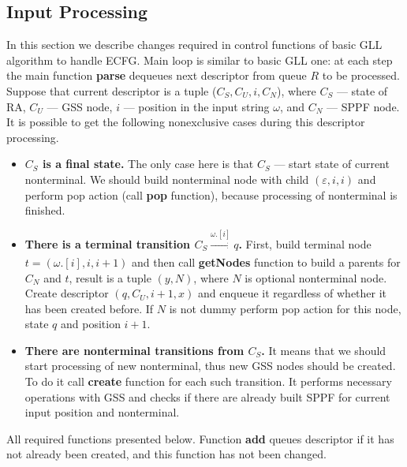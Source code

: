 \documentclass[runningheads,a4paper]{llncs}
\begin{document}
\subsection{Input Processing}%

In this section we describe changes required in control functions of basic GLL algorithm to handle ECFG.
Main loop is similar to basic GLL one: at each step the main function \textbf{parse} dequeues next descriptor
from queue $R$ to be processed.
Suppose that current descriptor is a tuple ($C_S, C_U, i, C_N$), where $C_S$ --- state of RA,
$C_U$ --- GSS node, $i$ --- position in the input string $\omega$, and $C_N$ --- SPPF node. 
It is possible to get the following nonexclusive cases during this descriptor processing.

\begin{itemize} 
    \item \textbf{$C_S$ is a final state.} The only case here is that $C_S$ --- start state of current nonterminal. 
    We should build nonterminal node with child $(\varepsilon, i, i)$ and perform pop action
    (call \textbf{pop} function), because processing of nonterminal is finished.
    
    \item \textbf{There is a terminal transition $C_S \xrightarrow[]{\omega.[i]} q$.} 
    First, build terminal node $ t = (\omega.[i], i, i+1) $ and then call \textbf{getNodes} function
    to build a parents for $ C_N $ and $ t $, result is a tuple $ (y, N) $, where $N$ is optional nonterminal node.
    Create descriptor $ (q, C_U, i+1, x) $ and enqueue it regardless of whether it has been created before.
    If $ N $ is not dummy perform pop action for this node,
    state $ q $ and position $i + 1 $.
    
    \item\textbf{ There are nonterminal transitions from $C_S$.}
    It means that we should start processing of new nonterminal, thus new GSS nodes should be created.
    To do it call \textbf{create} function for each such transition.
    It performs necessary operations with GSS and checks if there are already built
    SPPF for current input position and nonterminal.
\end{itemize}

All required functions presented below.
Function \textbf{add} queues descriptor if it has not already been created, and this function has not been changed.

\end{document}
